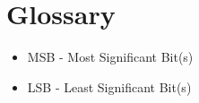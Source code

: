 \section{Glossary}

\begin{itemize}
\item \label{trm::MSB} MSB  - Most Significant Bit(s)
\item \label{trm::LSB} LSB  - Least Significant Bit(s)
\end{itemize}